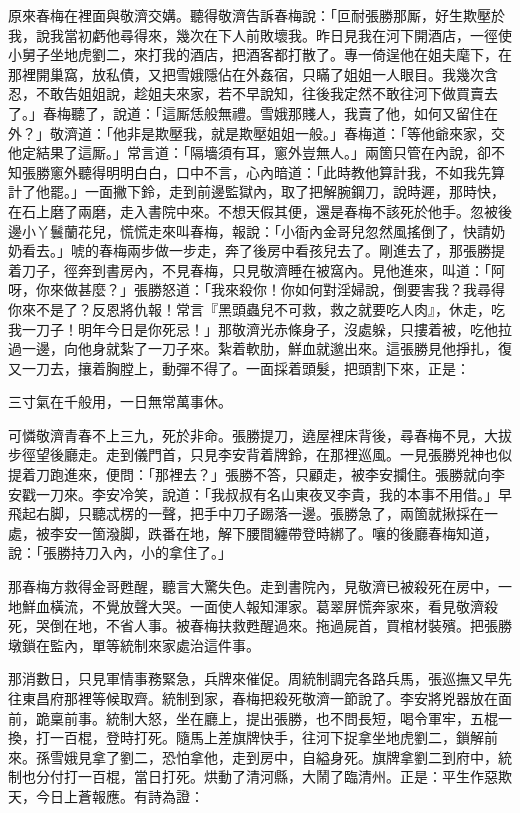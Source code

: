 原來春梅在裡面與敬濟交媾。聽得敬濟告訴春梅說：「叵耐張勝那厮，好生欺壓於我，說我當初虧他尋得來，幾次在下人前敗壞我。昨日見我在河下開酒店，一徑使小舅子坐地虎劉二，來打我的酒店，把酒客都打散了。專一倚逞他在姐夫麾下，在那裡開巢窩，放私債，又把雪娥隱佔在外姦宿，只瞞了姐姐一人眼目。我幾次含忍，不敢告姐姐說，趁姐夫來家，若不早說知，往後我定然不敢往河下做買賣去了。」春梅聽了，說道：「這厮恁般無禮。雪娥那賤人，我賣了他，如何又留住在外？」敬濟道：「他非是欺壓我，就是欺壓姐姐一般。」春梅道：「等他爺來家，交他定結果了這厮。」{}常言道：「隔墻須有耳，窻外豈無人。」兩箇只管在內說，卻不知張勝窻外聽得明明白白，口中不言，心內暗道：「此時教他算計我，不如我先算計了他罷。」{}一面撇下鈴，走到前邊監獄內，取了把解腕鋼刀，說時遲，那時快，在石上磨了兩磨，走入書院中來。不想天假其便，還是春梅不該死於他手。忽被後邊小丫鬟蘭花兒，慌慌走來叫春梅，報說：「小衙內金哥兒忽然風搖倒了，快請奶奶看去。」唬的春梅兩步做一步走，奔了後房中看孩兒去了。剛進去了，那張勝提着刀子，徑奔到書房內，不見春梅，只見敬濟睡在被窩內。見他進來，叫道：「阿呀，你來做甚麼？」張勝怒道：「我來殺你！{}你如何對淫婦說，倒要害我？我尋得你來不是了？反恩將仇報！常言『黑頭蟲兒不可救，救之就要吃人肉』，休走，吃我一刀子！明年今日是你死忌！」{}那敬濟光赤條身子，沒處躲，只摟着被，吃他拉過一邊，向他身就紮了一刀子來。紮着軟肋，鮮血就邈出來。這張勝見他掙扎，復又一刀去，攘着胸膛上，動彈不得了。一面採着頭髮，把頭割下來，{}正是：

\begin{myquote}
三寸氣在千般用，一日無常萬事休。
\end{myquote}

可憐敬濟青春不上三九，死於非命。張勝提刀，遶屋裡床背後，尋春梅不見，大拔步徑望後廳走。走到儀門首，只見李安背着牌鈴，在那裡巡風。一見張勝兇神也似提着刀跑進來，便問：「那裡去？」張勝不答，只顧走，被李安攔住。張勝就向李安戳一刀來。李安冷笑，說道：「我叔叔有名山東夜叉李貴，我的本事不用借。」早飛起右脚，只聽忒楞的一聲，把手中刀子踢落一邊。{}張勝急了，兩箇就揪採在一處，被李安一箇潑脚，跌番在地，解下腰間纏帶登時綁了。嚷的後廳春梅知道，說：「張勝持刀入內，小的拿住了。」

那春梅方救得金哥甦醒，聽言大驚失色。走到書院內，見敬濟已被殺死在房中，一地鮮血橫流，不覺放聲大哭。一面使人報知渾家。葛翠屏慌奔家來，看見敬濟殺死，哭倒在地，不省人事。被春梅扶救甦醒過來。拖過屍首，買棺材裝殯。把張勝墩鎖在監內，單等統制來家處治這件事。

那消數日，只見軍情事務緊急，兵牌來催促。周統制調完各路兵馬，張巡撫又早先往東昌府那裡等候取齊。統制到家，春梅把殺死敬濟一節說了。李安將兇器放在面前，跪稟前事。統制大怒，坐在廳上，提出張勝，也不問長短，喝令軍牢，五棍一換，打一百棍，登時打死。隨馬上差旗牌快手，往河下捉拿坐地虎劉二，鎖解前來。孫雪娥見拿了劉二，恐怕拿他，走到房中，自縊身死。旗牌拿劉二到府中，統制也分付打一百棍，當日打死。{}烘動了清河縣，大鬧了臨清州。正是：平生作惡欺天，今日上蒼報應。有詩為證：

